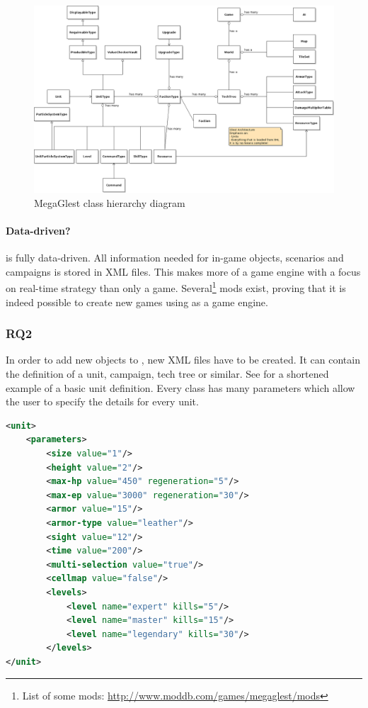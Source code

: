 \begin{figure}[h!]
    \centering
    \includegraphics[angle=90,width=\textwidth]{pics/gamehierarchy}
    \caption{MegaGlest class hierarchy diagram}
    \label{fig:glestclassh}
\end{figure}

\paragraph{Data-driven?}
\GLEST{} is fully data-driven. All information needed for in-game objects, scenarios and campaigns is stored in XML files.
This makes \GLEST{} more of a game engine with a focus on real-time strategy than only a game. Several\footnote{List of
some mods: \url{http://www.moddb.com/games/megaglest/mods}} mods exist, proving that it is indeed possible to create new
games using \GLEST{} as a game engine. 

\subsubsection{RQ2}
In order to add new objects to \GLEST{}, new XML files have to be created. It can contain the definition of a unit, campaign,
tech tree or similar. See  for a shortened example of a basic unit definition. Every class has many
parameters which allow the user to specify the details for every unit. 

\begin{lstlisting}[language=XML,caption=A basic \GLEST{} (shortened) unit definition in XML, label=glestxml]
<unit>
	<parameters>
		<size value="1"/>
		<height value="2"/>
		<max-hp value="450" regeneration="5"/>
		<max-ep value="3000" regeneration="30"/>
		<armor value="15"/>	
		<armor-type value="leather"/>
		<sight value="12"/>
		<time value="200"/>	
		<multi-selection value="true"/>	
		<cellmap value="false"/>
		<levels>
			<level name="expert" kills="5"/>
			<level name="master" kills="15"/>
			<level name="legendary" kills="30"/>
		</levels>
</unit>
\end{lstlisting}

